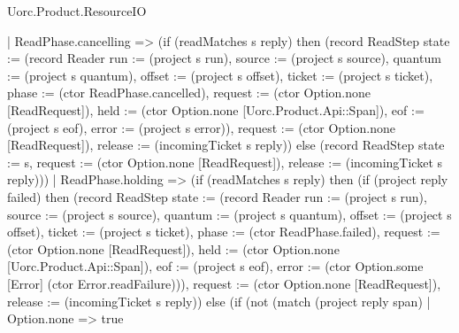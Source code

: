 \begin{lexlean}{Uorc.Product.ResourceIO}
\begin{semanticmodule}
{    | ReadPhase.cancelling => (if (readMatches s reply) then (record ReadStep {state := (record Reader {run := (project s run), source := (project s source), quantum := (project s quantum), offset := (project s offset), ticket := (project s ticket), phase := (ctor ReadPhase.cancelled), request := (ctor Option.none [ReadRequest]), held := (ctor Option.none [Uorc.Product.Api::Span]), eof := (project s eof), error := (project s error)}), request := (ctor Option.none [ReadRequest]), release := (incomingTicket s reply)}) else (record ReadStep {state := s, request := (ctor Option.none [ReadRequest]), release := (incomingTicket s reply)}))
    | ReadPhase.holding => (if (readMatches s reply) then (if (project reply failed) then (record ReadStep {state := (record Reader {run := (project s run), source := (project s source), quantum := (project s quantum), offset := (project s offset), ticket := (project s ticket), phase := (ctor ReadPhase.failed), request := (ctor Option.none [ReadRequest]), held := (ctor Option.none [Uorc.Product.Api::Span]), eof := (project s eof), error := (ctor Option.some [Error] (ctor Error.readFailure))}), request := (ctor Option.none [ReadRequest]), release := (incomingTicket s reply)}) else (if (not (match (project reply span)
      | Option.none => true
}
\end{semanticmodule}
\end{lexlean}

